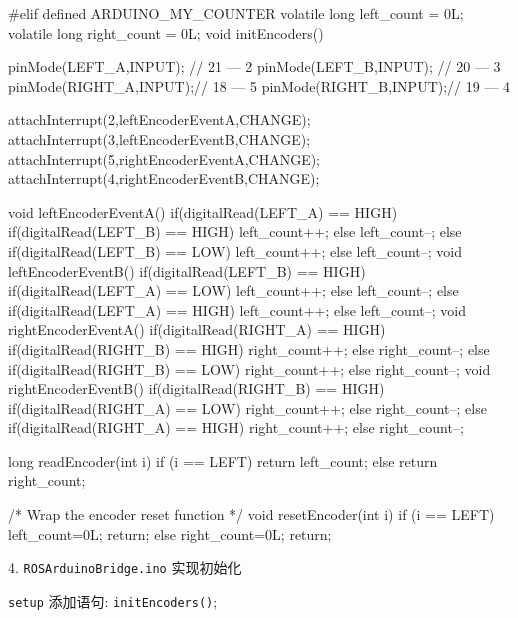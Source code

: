 \documentclass[openany, fontset=windowsold]{ctexbook}
\theoremstyle{kaiti}
\theoremstyle{normal}
\begin{document}
\begin{cpp}
  #elif defined ARDUINO_MY_COUNTER
    volatile long left_count = 0L;
    volatile long right_count = 0L;
    void initEncoders(){
      pinMode(LEFT_A,INPUT); // 21  --- 2
      pinMode(LEFT_B,INPUT); // 20  --- 3
      pinMode(RIGHT_A,INPUT);// 18  --- 5
      pinMode(RIGHT_B,INPUT);// 19  --- 4

      attachInterrupt(2,leftEncoderEventA,CHANGE);
      attachInterrupt(3,leftEncoderEventB,CHANGE);
      attachInterrupt(5,rightEncoderEventA,CHANGE);
      attachInterrupt(4,rightEncoderEventB,CHANGE);
    }
    void leftEncoderEventA(){
      if(digitalRead(LEFT_A) == HIGH){
        if(digitalRead(LEFT_B) == HIGH){
          left_count++;
        } else {
          left_count--;
        }
      } else {
        if(digitalRead(LEFT_B) == LOW){
          left_count++;
        } else {
          left_count--;
        }
      }
    }
    void leftEncoderEventB(){
      if(digitalRead(LEFT_B) == HIGH){
        if(digitalRead(LEFT_A) == LOW){
          left_count++;
        } else {
          left_count--;
        }
      } else {
        if(digitalRead(LEFT_A) == HIGH){
          left_count++;
        } else {
          left_count--;
        }
      }
    }
    void rightEncoderEventA(){
      if(digitalRead(RIGHT_A) == HIGH){
        if(digitalRead(RIGHT_B) == HIGH){
          right_count++;
        } else {
          right_count--;
        }
      } else {
        if(digitalRead(RIGHT_B) == LOW){
          right_count++;
        } else {
          right_count--;
        }
      }  
    }
    void rightEncoderEventB(){
      if(digitalRead(RIGHT_B) == HIGH){
        if(digitalRead(RIGHT_A) == LOW){
          right_count++;
        } else {
          right_count--;
        }
      } else {
        if(digitalRead(RIGHT_A) == HIGH){
          right_count++;
        } else {
          right_count--;
        }
      }  
    }

    long readEncoder(int i) {
      if (i == LEFT) return left_count;
      else return right_count;
    }

    /* Wrap the encoder reset function */
    void resetEncoder(int i) {
      if (i == LEFT){
        left_count=0L;
        return;
      } else { 
        right_count=0L;
        return;
      }
    }
\end{cpp}

4. \verb|ROSArduinoBridge.ino| 实现初始化

\verb|setup| 添加语句: \verb|initEncoders()|;
\end{document}
